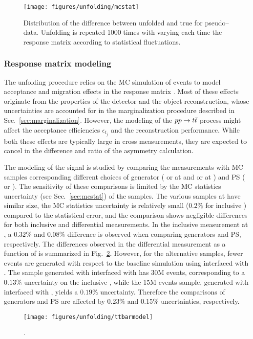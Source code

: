 \begin{figure}[!htb]\centering
  \texttt{[image: figures/unfolding/mcstat]}
  \caption{Distribution of the difference between unfolded \ac{} and
    true \ac{} for pseudo--data. Unfolding is repeated 1000 times with
  varying each time the response matrix according to statistical
  fluctuations.}
  \label{fig:mcstat}
\end{figure}

\subsubsection{Response matrix modeling}

The unfolding procedure relies on the MC simulation of \ttbar{} events
to model acceptance and migration effects in the response matrix
\TrasfMatrix{}. Most of these effects originate from the properties of
the detector and the object reconstruction, whose uncertainties are
accounted for in the marginalization procedure described in
Sec.~\ref{sec:marginalization}. However, the modeling of the
$pp\to t\bar{t}{}$ process might affect the acceptance efficiencies
$\epsilon_{t_j}$ and the reconstruction performance. While both these
effects are typically large in cross measurements, they are expected
to cancel in the difference and ratio of the asymmetry calculation.

The modeling of the \ttbar{} signal is studied by comparing the
measurements with MC samples corresponding different choices of generator
(\alpgen{} or \mcatnlo{} at \seventev{} and \powheg{} or \mcatnlo{} at
\eighttev{}) and PS (\pythia{} or \herwig{}).
The sensitivity of these comparisons is limited by the MC statistics
uncertainty (see Sec.~\ref{sec:mcstat}) of the samples. 
The various \ttbar{} samples  at \seventev{} have similar size, the MC
statistics uncertainty is relatively small ($0.2\%$ for inclusive
\ac{}) compared to the statistical error, and the comparison shows
negligible differences for both inclusive and differential measurements.
In the inclusive measurement at \eighttev{}, a $0.32\%$ and $0.08\%$
difference is observed when comparing generators and PS,
respectively. The differences observed in the differential measurement
as a function of \mtt{} is summarized in Fig.~\ref{fig:ttbarmodel}.
However, for the alternative \ttbar{} samples, fewer events are
generated with respect to the baseline simulation using \powheg{}
interfaced with \pythia{}. 
The sample generated with \powheg{} interfaced with \pythia{} has 30M events, corresponding to a $0.13\%$ uncertainty on the inclusive
\ac{}, while the 15M events sample, generated with \mcatnlo{}
interfaced with \herwig{}, yields a $0.19\%$ uncertainty. Therefore
the comparisons of generators and PS are affected by $0.23\%$ and
$0.15\%$ uncertainties, respectively.

\begin{figure}[!htb]\centering
  \texttt{[image: figures/unfolding/ttbarmodel]}
  \caption{.}
  \label{fig:ttbarmodel}
\end{figure}
